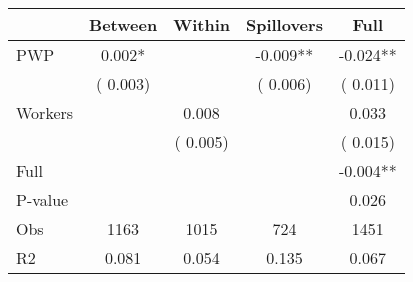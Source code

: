 
\begin{tabular}{l*{4}{c}}\hline&\multicolumn{1}{c}{Between}&\multicolumn{1}{c}{Within}&\multicolumn{1}{c}{Spillovers}&\multicolumn{1}{c}{Full}\\ \hline
 PWP           &              0.002*      &                                               &       -0.009** &        -0.024**                            \\ 
                               &        (       0.003)           &                                       &       (       0.006)     &      (       0.011)                                           \\ 
 Workers       &                                               &        0.008    &                                &             0.033                            \\ 
                               &                                               & (       0.005)                  &                                        &      (       0.015)                                           \\ 
\hline                                                                                                                                                                                                                                            
 Full                  &                                               &                                               &                                        &            -0.004**                                     \\ 
 P-value               &                                               &                                               &                                        &             0.026                                           \\ 
 Obs                   &               1163               &       1015                       &       724                &              1451                                               \\ 
 R2                    &                      0.081              &              0.054                      &              0.135               &                     0.067                                              \\ 
\hline \end{tabular}                                                                                                                                                                                                              